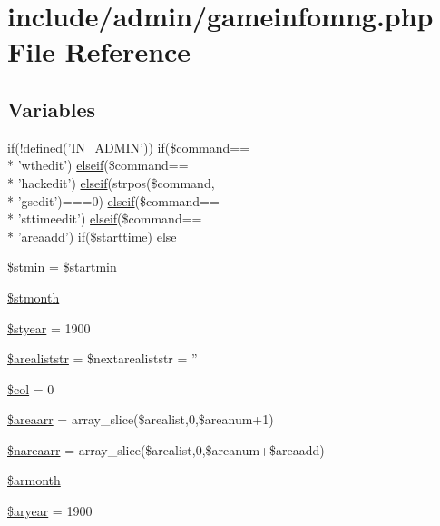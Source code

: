\hypertarget{gameinfomng_8php}{\section{include/admin/gameinfomng.php File Reference}
\label{gameinfomng_8php}
}
\subsection*{Variables}
\begin{DoxyCompactItemize}
\item 
\hyperlink{login__old_8php_a4ac1118c2e44c513a674bc1793ba6c90}{if}(!defined('\hyperlink{admin_8php_ad49472b0cdee543164375bf133a537f1}{I\+N\+\_\+\+A\+D\+M\+I\+N}')) \hyperlink{login__old_8php_a4ac1118c2e44c513a674bc1793ba6c90}{if}(\$command== \\*
'wthedit') \hyperlink{urlist_8php_a77f52b43f81ed05a41b68c2161789055}{elseif}(\$command== \\*
'hackedit') \hyperlink{urlist_8php_a77f52b43f81ed05a41b68c2161789055}{elseif}(strpos(\$command, \\*
'gsedit')===0) \hyperlink{urlist_8php_a77f52b43f81ed05a41b68c2161789055}{elseif}(\$command== \\*
'sttimeedit') \hyperlink{urlist_8php_a77f52b43f81ed05a41b68c2161789055}{elseif}(\$command== \\*
'areaadd') \hyperlink{login__old_8php_a4ac1118c2e44c513a674bc1793ba6c90}{if}(\$starttime) \hyperlink{gameinfomng_8php_a9934db7a41333980f5074d52a5a87346}{else}
\item 
\hyperlink{gameinfomng_8php_a673bc1547456f6d21e386b6d3add1b91}{\$stmin} = \$startmin
\item 
\hyperlink{gameinfomng_8php_a006358beabddbdb9061eb2079213a082}{\$stmonth}
\item 
\hyperlink{gameinfomng_8php_a9cfaedc526b9ac44dbc3a05ef88916ed}{\$styear} = 1900
\item 
\hyperlink{gameinfomng_8php_af92280f6ec8d2edeac2e7ace4f318b09}{\$arealiststr} = \$nextarealiststr = ''
\item 
\hyperlink{gameinfomng_8php_a6c0dccc8b4507bd8513a8f436e16e39c}{\$col} = 0
\item 
\hyperlink{gameinfomng_8php_acc2cd2dba20d325f25b899c214051046}{\$areaarr} = array\+\_\+slice(\$arealist,0,\$areanum+1)
\item 
\hyperlink{gameinfomng_8php_aae0e687b9aec3ddcaa1da1750caa671e}{\$nareaarr} = array\+\_\+slice(\$arealist,0,\$areanum+\$areaadd)
\item 
\hyperlink{gameinfomng_8php_a1576525095834b13ef0a2a4ce56f5109}{\$armonth}
\item 
\hyperlink{gameinfomng_8php_a6cb5127bd6798b74e88f6dd74bc5ef67}{\$aryear} = 1900
\end{DoxyCompactItemize}


